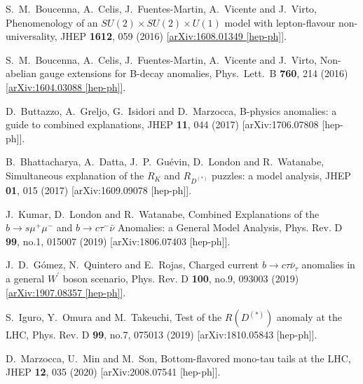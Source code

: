 \documentclass[reprint,showpacs,aps,prd,nofootinbib,superscriptaddress,longbibliography]{revtex4-1}
\begin{document}
\begin{thebibliography}{99}
S.~M.~Boucenna, A.~Celis, J.~Fuentes-Martin, A.~Vicente and J.~Virto, Phenomenology of an $SU(2) \times SU(2) \times U(1)$ model with lepton-flavour non-universality, JHEP {\bf 1612}, 059 (2016)  \href{http://arxiv.org/abs/1608.01349}{[arXiv:1608.01349 [hep-ph]]}.

S.~M.~Boucenna, A.~Celis, J.~Fuentes-Martin, A.~Vicente and J.~Virto, Non-abelian gauge extensions for B-decay anomalies, Phys.\ Lett.\ B {\bf 760}, 214 (2016) \href{http://arxiv.org/abs/1604.03088}{[arXiv:1604.03088 [hep-ph]]}.

D.~Buttazzo, A.~Greljo, G.~Isidori and D.~Marzocca, B-physics anomalies: a guide to combined explanations,
JHEP \textbf{11}, 044 (2017)
[arXiv:1706.07808 [hep-ph]].

B.~Bhattacharya, A.~Datta, J.~P.~Gu\'evin, D.~London and R.~Watanabe, Simultaneous explanation of the $R_K$ and $R_{D^{(*)}}$ puzzles: a model analysis, JHEP \textbf{01}, 015 (2017)
[arXiv:1609.09078 [hep-ph]].

J.~Kumar, D.~London and R.~Watanabe, Combined Explanations of the $b \to s \mu^+ \mu^-$ and $b \to c \tau^- {\bar\nu}$ Anomalies: a General Model Analysis,
Phys. Rev. D \textbf{99}, no.1, 015007 (2019)
[arXiv:1806.07403 [hep-ph]].

J.~D.~G\'omez, N.~Quintero and E.~Rojas, Charged current $b \to c \tau \bar{\nu}_\tau$ anomalies in a general $W^\prime$ boson scenario, Phys. Rev. D \textbf{100}, no.9, 093003 (2019)
\href{http://arxiv.org/abs/1907.08357}{[arXiv:1907.08357 [hep-ph]]}.

S.~Iguro, Y.~Omura and M.~Takeuchi, Test of the $R(D^{(*)})$ anomaly at the LHC,
Phys. Rev. D \textbf{99}, no.7, 075013 (2019)
[arXiv:1810.05843 [hep-ph]].

D.~Marzocca, U.~Min and M.~Son, Bottom-flavored mono-tau tails at the LHC, JHEP \textbf{12}, 035 (2020)
[arXiv:2008.07541 [hep-ph]].


\end{thebibliography}
\end{document}
